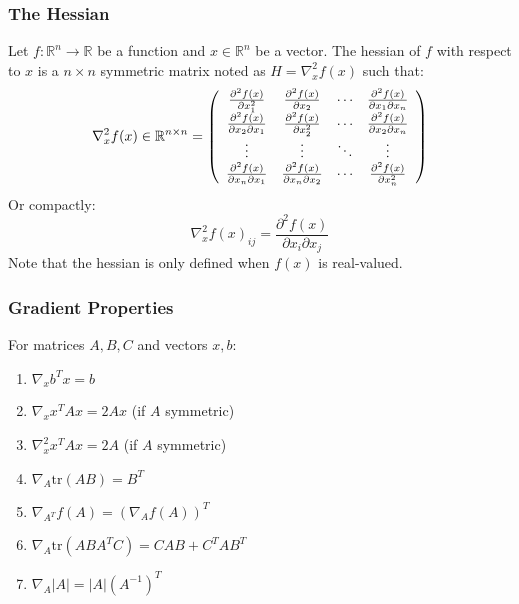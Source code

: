 \documentclass[twoside,twocolumn]{article}
\begin{document}
\subsubsection{The Hessian}
Let $f:\mathbb{R}^{n}\rightarrow\mathbb{R}$ be a function and
$x \in \mathbb{R}^{n}$ be a vector. The hessian of $f$ with respect to
$x$ is a $n \times n$ symmetric matrix noted as $H = \nabla_x^2 f(x)$ such that:
\begin{equation}
  \nabla _ { x } ^ { 2 } f ( x ) \in \mathbb { R } ^ { n \times n } = \left( \begin{array} { c c c c } { \frac { \partial ^ { 2 } f ( x ) } { \partial x _ { 1 } ^ { 2 } } } & { \frac { \partial ^ { 2 } f ( x ) } { \partial x _ { 2 } } } & { \cdots } & { \frac { \partial ^ { 2 } f ( x ) } { \partial x _ { 1 } \partial x _ { n } } } \\ { \frac { \partial ^ { 2 } f ( x ) } { \partial x _ { 2 } \partial x _ { 1 } } } & { \frac { \partial ^ { 2 } f ( x ) } { \partial x _ { 2 } ^ { 2 } } } & { \cdots } & { \frac { \partial ^ { 2 } f ( x ) } { \partial x _ { 2 } \partial x _ { n } } } \\ { \vdots } & { \vdots } & { \ddots } & { \vdots } \\ { \frac { \partial ^ { 2 } f ( x ) } { \partial x _ { n } \partial x _ { 1 } } } & { \frac { \partial ^ { 2 } f ( x ) } { \partial x _ { n } \partial x _ { 2 } } } & { \cdots } & { \frac { \partial ^ { 2 } f ( x ) } { \partial x _ { n } ^ { 2 } } } \end{array} \right)
\end{equation}
Or compactly:
\begin{equation}
  \nabla _ { x } ^ { 2 } f ( x ) _ { i j } = \frac { \partial ^ { 2 } f ( x ) } { \partial x _ { i } \partial x _ { j } }
\end{equation}
Note that the hessian is only defined when $f(x)$ is real-valued.
\subsubsection{Gradient Properties}
For matrices $A, B, C$ and vectors $x, b$:
\begin{enumerate}
  \item $\nabla_x b^Tx = b$
  \item $\nabla_x x^TAx = 2Ax$ (if $A$ symmetric)
  \item $\nabla^2_x x^TAx = 2A$ (if $A$ symmetric)
  \item $\nabla_A\textrm{tr}(AB)=B^T$
  \item $\nabla_{A^T}f(A)=\left(\nabla_Af(A)\right)^T$
  \item $\nabla_A\textrm{tr}(ABA^TC)=CAB+C^TAB^T$
  \item $\nabla_A|A|=|A|(A^{-1})^T$
\end{enumerate}
\end{document}
